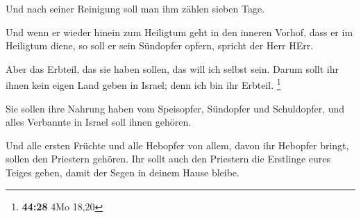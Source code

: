  Und nach seiner Reinigung soll man ihm zählen sieben Tage.

 Und wenn er wieder hinein zum Heiligtum geht in den
inneren Vorhof, dass er im Heiligtum diene, so soll er sein Sündopfer
opfern, spricht der Herr HErr.

 Aber das Erbteil, das sie haben sollen, das will ich
selbst sein. Darum sollt ihr ihnen kein eigen Land geben in Israel; denn
ich bin ihr Erbteil. \footnote{\textbf{44:28} 4Mo 18,20}

 Sie sollen ihre Nahrung haben vom Speisopfer, Sündopfer
und Schuldopfer, und alles Verbannte in Israel soll ihnen gehören.

 Und alle ersten Früchte und alle Hebopfer von allem, davon
ihr Hebopfer bringt, sollen den Priestern gehören. Ihr sollt auch den
Priestern die Erstlinge eures Teiges geben, damit der Segen in deinem
Hause bleibe.

